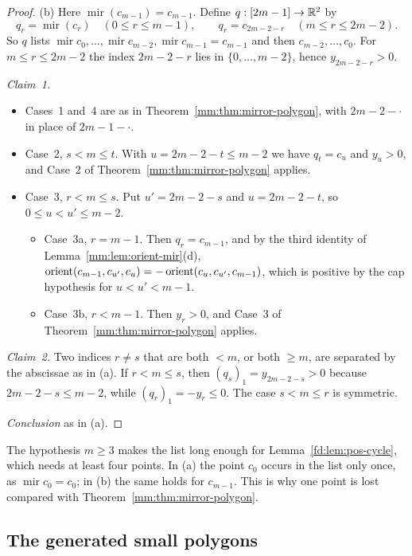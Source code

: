 \begin{proof}
(b) Here $\operatorname{mir}(c_{m-1})=c_{m-1}$. Define $q:[2m-1]\to\mathbb R^2$ by
\[ q_r=\operatorname{mir}(c_r)\quad(0\le r\le m-1),\qquad q_r=c_{2m-2-r}\quad(m\le r\le 2m-2). \]
So $q$ lists $\operatorname{mir}c_0,\dots,\operatorname{mir}c_{m-2},\operatorname{mir}c_{m-1}=c_{m-1}$ and
then $c_{m-2},\dots,c_0$. For $m\le r\le 2m-2$ the index $2m-2-r$ lies in $\{0,\dots,m-2\}$, hence
$y_{2m-2-r}>0$.

\emph{Claim~1.}
\begin{itemize}
\item Cases~1 and~4 are as in Theorem~\ref{mm:thm:mirror-polygon}, with $2m-2-\cdot$ in place of
  $2m-1-\cdot$.
\item Case~2, $s<m\le t$. With $u=2m-2-t\le m-2$ we have $q_t=c_u$ and $y_u>0$, and Case~2 of
  Theorem~\ref{mm:thm:mirror-polygon} applies.
\item Case~3, $r<m\le s$. Put $u'=2m-2-s$ and $u=2m-2-t$, so $0\le u<u'\le m-2$.
  \begin{itemize}
  \item Case~3a, $r=m-1$. Then $q_r=c_{m-1}$, and by the third identity of
    Lemma~\ref{mm:lem:orient-mir}(d), $\operatorname{orient}(c_{m-1},c_{u'},c_u)=-\operatorname{orient}(c_u,c_{u'},c_{m-1})$, which is
    positive by the cap hypothesis for $u<u'<m-1$.
  \item Case~3b, $r<m-1$. Then $y_r>0$, and Case~3 of Theorem~\ref{mm:thm:mirror-polygon} applies.
  \end{itemize}
\end{itemize}

\emph{Claim~2.} Two indices $r\ne s$ that are both $<m$, or both $\ge m$, are separated by the abscissae
as in (a). If $r<m\le s$, then $(q_s)_1=y_{2m-2-s}>0$ because $2m-2-s\le m-2$, while
$(q_r)_1=-y_r\le0$. The case $s<m\le r$ is symmetric.

\emph{Conclusion} as in (a).
\end{proof}

\begin{remark}
The hypothesis $m\ge3$ makes the list long enough for Lemma~\ref{fd:lem:pos-cycle}, which needs at least
four points. In (a) the point $c_0$ occurs in the list only once, as $\operatorname{mir}c_0=c_0$; in (b)
the same holds for $c_{m-1}$. This is why one point is lost compared with Theorem~\ref{mm:thm:mirror-polygon}.
\end{remark}

\subsection{The generated small polygons}

